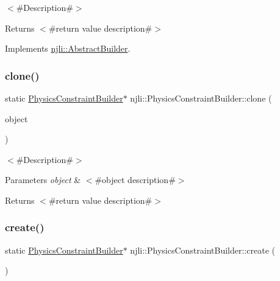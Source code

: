 $<$\#\+Description\#$>$

\begin{DoxyReturn}{Returns}
$<$\#return value description\#$>$ 
\end{DoxyReturn}


Implements \mbox{\hyperlink{classnjli_1_1_abstract_builder_aa1d220053e182c37b31b427499c6eacf}{njli\+::\+Abstract\+Builder}}.

\mbox{\label{classnjli_1_1_physics_constraint_builder_af19af90221577409e685cd820a581ffe}} 
\subsubsection{\texorpdfstring{clone()}{clone()}}
{\footnotesize\ttfamily static \mbox{\hyperlink{classnjli_1_1_physics_constraint_builder}{Physics\+Constraint\+Builder}}$\ast$ njli\+::\+Physics\+Constraint\+Builder\+::clone (\begin{DoxyParamCaption}\item[{const \mbox{\hyperlink{classnjli_1_1_physics_constraint_builder}{Physics\+Constraint\+Builder}} \&}]{object }\end{DoxyParamCaption})\hspace{0.3cm}{\ttfamily [static]}}

$<$\#\+Description\#$>$


\begin{DoxyParams}{Parameters}
{\em object} & $<$\#object description\#$>$\\
\hline
\end{DoxyParams}
\begin{DoxyReturn}{Returns}
$<$\#return value description\#$>$ 
\end{DoxyReturn}
\mbox{\label{classnjli_1_1_physics_constraint_builder_ae1634990857be090fffc4a838eb45581}} 
\subsubsection{\texorpdfstring{create()}{create()}}
{\footnotesize\ttfamily static \mbox{\hyperlink{classnjli_1_1_physics_constraint_builder}{Physics\+Constraint\+Builder}}$\ast$ njli\+::\+Physics\+Constraint\+Builder\+::create (\begin{DoxyParamCaption}{ }\end{DoxyParamCaption})\hspace{0.3cm}{\ttfamily [static]}}

